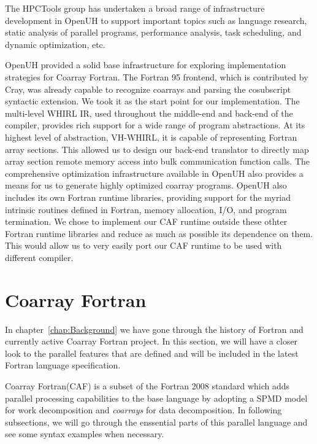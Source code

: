 The HPCTools group has undertaken a broad range of infrastructure development in OpenUH to support important topics such as language research, static analysis of parallel programs, performance analysis, task scheduling, and dynamic optimization, etc\cite{}.

OpenUH provided a solid base infrastructure for exploring implementation strategies for Coarray Fortran. The Fortran 95 frontend, which is contributed by Cray, was already capable to recognize coarrays and parsing the cosubscript syntactic extension. We took it as the start point for our implementation. The multi-level WHIRL IR, used throughout the middle-end and back-end of the compiler, provides rich support for a wide range of program abstractions. At its highest level of abstraction, VH-WHIRL, it is capable of representing Fortran array sections. This allowed us to design our back-end translator to directly map array section remote memory access into bulk communication function calls. The comprehensive optimization infrastructure available in OpenUH also provides a means for us to generate highly optimized coarray programs. OpenUH also includes its own Fortran runtime libraries, providing support for the myriad intrinsic routines defined in Fortran, memory allocation, I/O, and program termination. We chose to implement our CAF runtime outside these othter Fortran runtime libraries and reduce as much as possible its dependence on them. This would allow us to very easily port our CAF runtime to be used with different compiler.

\section{Coarray Fortran}\label{sec:coarrays}
In chapter~\ref{chap:Background} we have gone through the history of Fortran and currently active Coarray Fortran project. In this section, we will have a closer look to the parallel features that are defined and will be included in the latest Fortran language specification. 

Coarray Fortran(CAF) is a subset of the Fortran 2008 standard which adds parallel processing capabilities to the base language by adopting a SPMD model for work decomposition and \emph{coarrays} for data decomposition. In following subsections, we will go through the enssential parts of this parallel language and see some syntax examples when necessary. 


